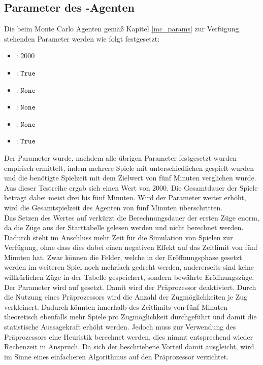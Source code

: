 \subsection{Parameter des -Agenten}
\label{eval:agents:params:subsec-mc}
Die beim Monte Carlo Agenten gemäß Kapitel \ref{mc_params} zur Verfügung stehenden Parameter werden wie folgt festgesetzt:
\begin{itemize}
\item {}: $2000$
\item {}: $\mathtt{True}$
\item {}: $\mathtt{None}$
\item {}: $\mathtt{None}$
\item {}: $\mathtt{None}$
\item {}: $\mathtt{True}$
\end{itemize}
Der Parameter  wurde, nachdem alle übrigen Parameter festgesetzt wurden empirisch ermittelt, indem mehrere Spiele mit unterschiedlichen  gespielt wurden und die benötigte Spielzeit mit dem Zielwert von fünf Minuten verglichen wurde. Aus dieser Testreihe ergab sich einen  Wert von $2000$. Die Gesamtdauer der Spiele beträgt dabei meist drei bis fünf Minuten. Wird der Parameter weiter erhöht, wird die Gesamtspielzeit des Agenten von fünf Minuten überschritten.
\\Das Setzen des Wertes auf  verkürzt die Berechnungsdauer der ersten Züge enorm, da die Züge aus der Starttabelle gelesen werden und nicht berechnet werden. Dadurch steht im Anschluss mehr Zeit für die Simulation von Spielen zur Verfügung, ohne dass dies dabei einen negativen Effekt auf das Zeitlimit von fünf Minuten hat. Zwar können die Felder, welche in der Eröffnungsphase gesetzt werden im weiteren Spiel noch mehrfach gedreht werden, andererseits sind keine willkürlichen Züge in der Tabelle gespeichert, sondern bewährte Eröffnungszüge.
\\Der Parameter  wird auf  gesetzt. Damit wird der Präprozessor deaktiviert. Durch die Nutzung eines Präprozessors wird die Anzahl der Zugmöglichkeiten je Zug verkleinert. Dadurch könnten innerhalb des Zeitlimits von fünf Minuten theoretisch ebenfalls mehr Spiele pro Zugmöglichkeit durchgeführt und damit die statistische Aussagekraft erhöht werden. Jedoch muss zur Verwendung des Präprozessors eine Heuristik berechnet werden, dies nimmt entsprechend wieder Rechenzeit in Anspruch. Da sich der beschriebene Vorteil damit ausgleicht, wird im Sinne eines einfacheren Algorithmus auf den Präprozessor verzichtet.
